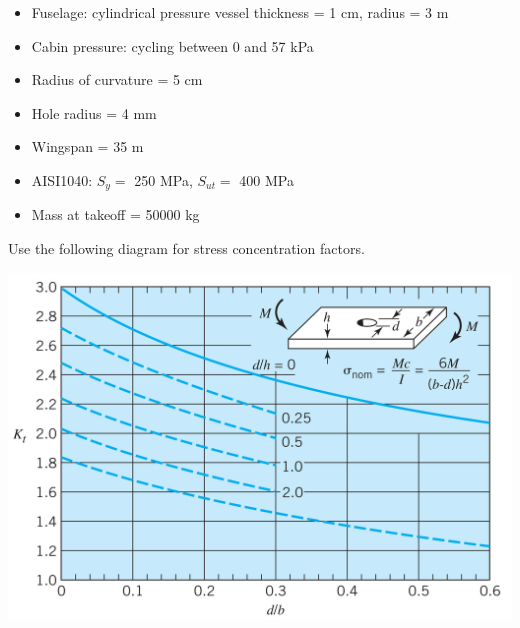 \documentclass[a4paper,openany,nobib]{tufte-book}
\begin{document}
\begin{itemize}
\item Fuselage: cylindrical pressure vessel thickness = 1 cm, radius = 3 m

\item Cabin pressure: cycling between 0 and 57 kPa

\item Radius of curvature = 5 cm

\item Hole radius = 4 mm

\item Wingspan = 35 m

\item AISI1040: \(S_y =\) 250 MPa, \(S_{ut} =\) 400 MPa

\item Mass at takeoff = 50000 kg
\end{itemize}

Use the following diagram for stress concentration factors.


\begin{center}
\includegraphics[width=.9\linewidth]{pictures/Static-body-load-analysis/stress-conc-bending-plate.png}
\end{center}
\end{document}
